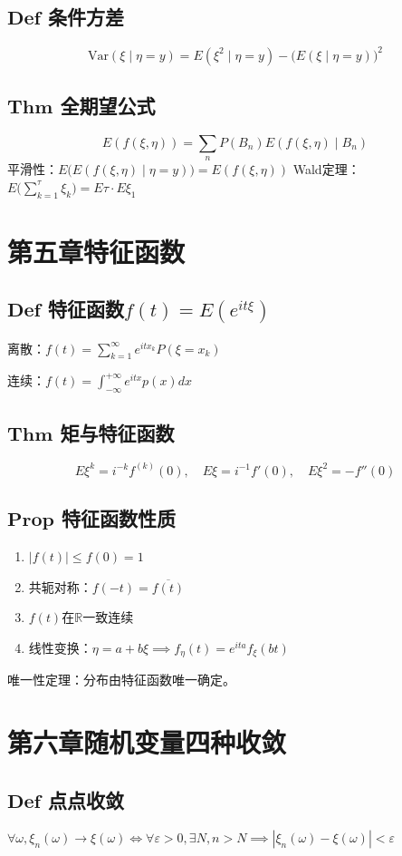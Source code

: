 \documentclass{article}
\begin{document}
	\subsection{$\bm{Def}$ 条件方差}
	\[
	\mathrm{Var}(\xi\mid\eta=y)=E(\xi^2\mid\eta=y)-\big(E(\xi\mid\eta=y)\big)^2
	\]
	\subsection{$\bm{Thm}$ 全期望公式}
	\[
	E(f(\xi,\eta))=\sum_nP(B_n)E(f(\xi,\eta)\mid B_n)
	\]
	平滑性：$E\big(E(f(\xi,\eta)\mid\eta=y)\big)=E(f(\xi,\eta))$
	Wald定理：$E\Big(\sum_{k=1}^{\tau}\xi_k\Big)=E\tau\cdot E\xi_1$
	
	\section{第五章\quad 特征函数}
	\subsection{$\bm{Def}$ 特征函数$f(t)=E(e^{it\xi})$}
	离散：$\displaystyle f(t)=\sum_{k=1}^{\infty}e^{itx_k}P(\xi=x_k)$
	
	\noindent 连续：$\displaystyle f(t)=\int_{-\infty}^{+\infty}e^{itx}p(x)dx$
	\subsection{$\bm{Thm}$ 矩与特征函数}
	\[
	E\xi^k=i^{-k}f^{(k)}(0),\quad E\xi=i^{-1}f'(0),\quad E\xi^2=-f''(0)
	\]
	\subsection{$\bm{Prop}$ 特征函数性质}
	\begin{enumerate}
		\item $|f(t)|\le f(0)=1$
		\item 共轭对称：$f(-t)=\overline{f(t)}$
		\item $f(t)$在$\mathbb{R}$一致连续
		\item 线性变换：$\eta=a+b\xi\implies f_{\eta}(t)=e^{ita}f_{\xi}(bt)$
	\end{enumerate}
	唯一性定理：分布由特征函数唯一确定。
	
	\section{第六章\quad 随机变量四种收敛}
	\subsection{$\bm{Def}$ 点点收敛}
	$\forall\omega,\xi_n(\omega)\to\xi(\omega)\iff\forall\varepsilon>0,\exists N,n>N\implies|\xi_n(\omega)-\xi(\omega)|<\varepsilon$
\end{document}
